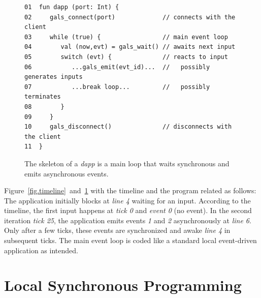 \documentclass[sigplan,screen]{acmart}
\begin{document}
\begin{figure}[t]
{\scriptsize
\begin{verbatim}
01  fun dapp (port: Int) {
02     gals_connect(port)             // connects with the client
03     while (true) {                 // main event loop
04        val (now,evt) = gals_wait() // awaits next input
05        switch (evt) {              // reacts to input
06           ...gals_emit(evt_id)...  //   possibly generates inputs
07           ...break loop...         //   possibly terminates
08        }
09     }
10     gals_disconnect()              // disconnects with the client
11  }
\end{verbatim}
}
  \caption{
    \label{fig.skel}
    The skeleton of a \emph{dapp} is a main loop that waits synchronous and
    emits asynchronous events.
  }
\end{figure}

Figure~\ref{fig.timeline}~and~\ref{fig.skel} with the timeline and the program
related as follows:
The application initially blocks at \emph{line 4} waiting for an input.
According to the timeline, the first input happens at \emph{tick 0} and
\emph{event 0} (no event).
In the second iteration \emph{tick 25}, the application emits events \emph{1}
and \emph{2} asynchronously at \emph{line 6}.
Only after a few ticks, these events are synchronized and awake \emph{line 4}
in subsequent ticks.
The main event loop is coded like a standard local event-driven application as
intended.

\section{Local Synchronous Programming}
\label{sec.sync}
\end{document}

